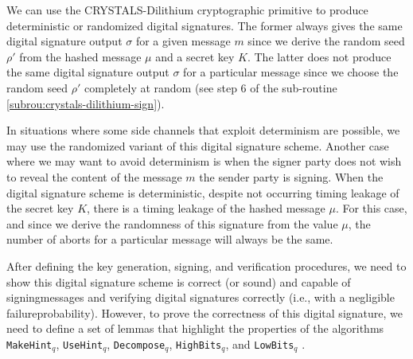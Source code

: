 \documentclass[runningheads]{llncs}
\numberwithin{equation}{section}
\begin{document}
    We can use the CRYSTALS-Dilithium cryptographic primitive to produce deterministic or randomized digital signatures. The former always gives the same digital signature output $\sigma$ for a given message $m$ since we derive the random seed $\rho'$ from the hashed message $\mu$ and a secret key $K$. The latter does not produce the same digital signature output $\sigma$ for a particular message since we choose the random seed $\rho'$ completely at random (see step 6 of the sub-routine \ref{subrou:crystals-dilithium-sign}).
    
    In situations where some side channels that exploit determinism are possible\break \cite{samwel-et-al:breaking-ed25519-wolfssl:2018:06-2024,poddebniak-et-al:attacking-deterministic-signature-scheme-using-fault-attacks:2018:06-2024}, we may use the randomized variant of this digital signature scheme. Another case where we may want to avoid determinism is when the signer party does not wish to reveal the content of the message $m$ the sender party is signing. When the digital signature scheme is deterministic, despite not occurring timing leakage of the secret key $K$, there is a timing leakage of the hashed message $\mu$. For this case, and since we derive the randomness of this signature from the value $\mu$, the number of aborts for a particular message will always be the same.

    \vspace{1ex}

    \noindent After defining the key generation, signing, and verification procedures, we need to show this digital signature scheme is correct (or sound) and capable of signing\break messages and verifying digital signatures correctly (i.e., with a negligible failure\break probability). However, to prove the correctness of this digital signature, we need to define a set of lemmas that highlight the properties of the algorithms \texttt{MakeHint}${}_{q}$, \texttt{UseHint}${}_{q}$, \texttt{Decompose}${}_{q}$, \texttt{HighBits}${}_{q}$, and \texttt{LowBits}${}_{q}$ \cite{ducas-et-al:crystals-dilithium-algorithm-specifications-and-supporting-documentation:2017:06-2024,ducas-et-al:crystals-dilithium-lattice-based-digital-signature-scheme:2018:06-2024}.
\end{document}
